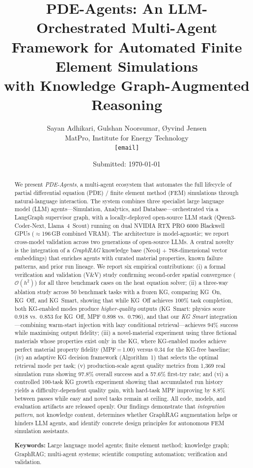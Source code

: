 \documentclass[twocolumn]{article}
\title{\textbf{PDE-Agents: An LLM-Orchestrated Multi-Agent\\
       Framework for Automated Finite Element Simulations\\
       with Knowledge Graph-Augmented Reasoning}}
\author{%
  Sayan Adhikari, Gulshan Noorsumar, Øyvind Jensen\\
  \small MatPro, Institute for Energy Technology\\
  \small \texttt{[email]}
}
\date{\small Submitted: \today}
\begin{document}
\maketitle

\begin{abstract}
We present \textit{PDE-Agents}, a multi-agent ecosystem that automates the
full lifecycle of partial differential equation (PDE) / finite element method
(FEM) simulations through natural-language interaction.  The system combines three specialist large language model (LLM)
agents—Simulation, Analytics, and Database—orchestrated via a LangGraph
supervisor graph, with a locally-deployed open-source LLM stack
(Qwen3-Coder-Next, Llama~4~Scout) running on dual NVIDIA RTX PRO 6000
Blackwell GPUs ($\approx$196\,GB combined VRAM).  The architecture is
model-agnostic; we report cross-model validation across two
generations of open-source LLMs.
A central novelty is the integration of a \emph{GraphRAG} knowledge base
(Neo4j + 768-dimensional vector embeddings) that enriches agents with curated
material properties, known failure patterns, and prior run lineage.
We report six empirical contributions: (i) a formal verification and
validation (V\&V) study confirming second-order spatial convergence (\(\mathcal{O}(h^2)\))
for all three benchmark cases on the heat equation solver; (ii) a
three-way ablation study across 50 benchmark tasks with a frozen KG,
comparing KG~On, KG~Off, and KG~Smart,
showing that while KG~Off achieves 100\% task completion,
both KG-enabled modes produce \emph{higher-quality} outputs
(KG~Smart: physics score 0.918 vs.\ 0.853 for KG~Off,
 MPF 0.898 vs.\ 0.796), and that our \emph{KG Smart}
integration---combining warm-start injection with lazy conditional
retrieval---achieves 94\% success while maximising output fidelity;
(iii) a novel-material experiment using three fictional materials
whose properties exist only in the KG, where KG-enabled modes achieve
perfect material property fidelity (MPF\,=\,1.00) versus 0.34 for the
KG-free baseline; (iv) an adaptive KG decision framework (Algorithm~1)
that selects the optimal retrieval mode per task;
(v) production-scale agent quality
metrics from 1{,}369 real simulation runs showing 97.8\% overall success
and a 57.6\% first-try rate; and (vi) a controlled 100-task KG growth experiment showing
that accumulated run history yields a difficulty-dependent quality
gain, with hard-task MPF improving by 8.8\% between passes while
easy and novel tasks remain at ceiling.  All code, models, and evaluation artifacts
are released openly.  Our findings demonstrate that \emph{integration
pattern}, not knowledge content, determines whether GraphRAG augmentation
helps or hinders LLM agents, and identify concrete design principles
for autonomous FEM simulation assistants.

\smallskip\noindent\textbf{Keywords:} Large language model agents; finite element
method; knowledge graph; GraphRAG; multi-agent systems; scientific computing
automation; verification and validation.
\end{abstract}
\end{document}
